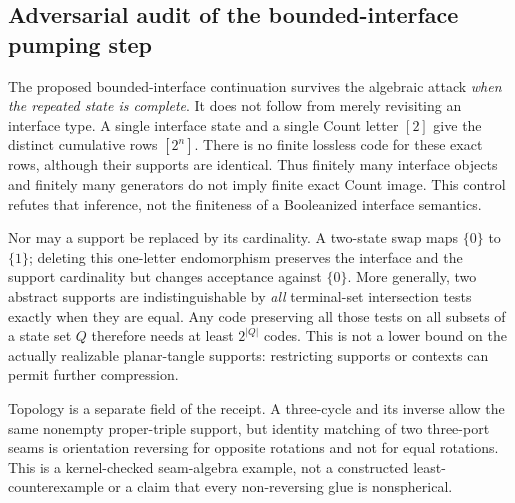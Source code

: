 \subsection{Adversarial audit of the bounded-interface pumping step}
\label{sec:bounded-interface-pumping-audit}

The proposed bounded-interface continuation survives the algebraic attack
\emph{when the repeated state is complete}. It does not follow from merely
revisiting an interface type. A single interface state and a single Count
letter $[2]$ give the distinct cumulative rows $[2^n]$. There is no finite
lossless code for these exact rows, although their supports are identical.
Thus finitely many interface objects and finitely many generators do not
imply finite exact Count image. This control refutes that inference, not
the finiteness of a Booleanized interface semantics.

Nor may a support be replaced by its cardinality. A two-state swap maps
$\{0\}$ to $\{1\}$; deleting this one-letter endomorphism preserves the
interface and the support cardinality but changes acceptance against
$\{0\}$. More generally, two abstract supports are indistinguishable by
\emph{all} terminal-set intersection tests exactly when they are equal.
Any code preserving all those tests on all subsets of a state set $Q$
therefore needs at least $2^{|Q|}$ codes. This is not a lower bound on the
actually realizable planar-tangle supports: restricting supports or
contexts can permit further compression.

Topology is a separate field of the receipt. A three-cycle and its inverse
allow the same nonempty proper-triple support, but identity matching of two
three-port seams is orientation reversing for opposite rotations and not
for equal rotations. This is a kernel-checked seam-algebra example, not a
constructed least-counterexample or a claim that every non-reversing glue
is nonspherical.

